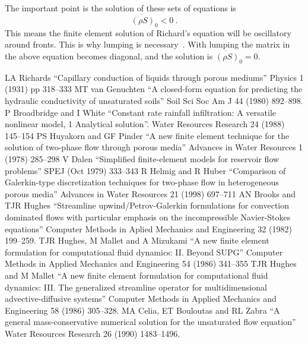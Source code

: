 \documentclass[]{scrreprt}
\begin{document}
The important point is the solution of these sets of equations is
\begin{equation}
\dot{(\rho S)}_{0} < 0 \ .
\end{equation}
This means the finite element solution of Richard's equation will be
oscillatory around fronts.  This is why lumping is
necessary~\cite{celiaET1990}.  With lumping the matrix in the above
equation becomes diagonal, and the solution is $\dot{(\rho S)}_{0} =
0$.







\begin{thebibliography}{99}
LA Richards ``Capillary conduction of
  liquids through porous mediums''   Physics 1 (1931) pp 318--333
MT van Genuchten ``A closed-form equation
  for predicting the hydraulic conductivity of unsaturated soils''
  Soil Sci Soc Am J 44 (1980) 892--898.
P Broadbridge and I White ``Constant rate rainfall
  infiltration: A versatile nonlinear model, 1 Analytical solution''.
  Water Resources Research 24 (1988) 145--154
PS Huyakorn and GF Pinder ``A new finite element
  technique for the solution of two-phase flow through porous media''
  Advances in Water Resources 1 (1978) 285--298
V Dalen ``Simplified finite-element models for
  reservoir flow problems'' SPEJ (Oct 1979) 333--343
R Helmig and R Huber ``Comparison of Galerkin-type
  discretization techniques for two-phase flow in heterogeneous porous
  media''  Advances in Water Resources 21 (1998) 697--711
AN Brooks and TJR Hughes ``Streamline
  upwind/Petrov-Galerkin formulations for convection dominated flows
  with particular emphasis on the incompressible Navier-Stokes
  equations''  Computer Methods in Aplied Mechanics and Engineering 32
  (1982) 199--259.
TJR Hughes, M Mallet and A Mizukami ``A new finite element
  formulation for computational fluid dynamics: II. Beyond SUPG''
  Computer Methods in Applied Mechanics and Engineering 54 (1986) 341--355
TJR Hughes and M Mallet ``A new finite element
  formulation for computational fluid dynamics: III. The generalized
  streamline operator for multidimensional advective-diffusive
  systems''  Computer Methods in Applied Mechanics and Engineering 58
  (1986) 305--328.
MA Celia, ET Bouloutas and RL Zabra ``A general
  mass-conservative numerical solution for the unsaturated flow
  equation''  Water Resources Research 26 (1990) 1483--1496.
\end{thebibliography}
\end{document}
